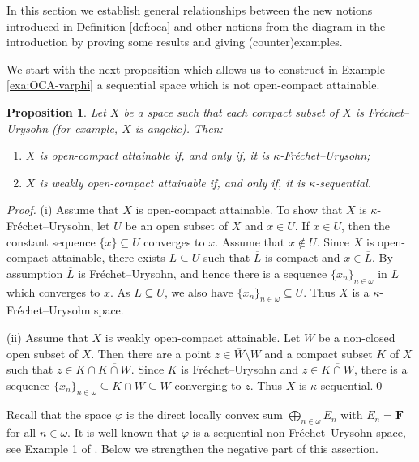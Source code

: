 \documentclass[preprint,11pt]{elsarticle}
\newtheorem{proposition}[theorem]{Proposition}
\numberwithin{equation}{section}
\numberwithin{theorem}{section}
\newcommand{\w}{\omega}
\newcommand{\SM}{{\setminus}}
\begin{document}
In this section we establish general relationships between the new notions introduced  in Definition \ref{def:oca} and other notions from the diagram in the introduction by proving some results and giving (counter)examples.

We start with the next proposition which allows us to construct in Example \ref{exa:OCA-varphi} a sequential space which is not open-compact attainable.  %
\begin{proposition} \label{p:OCA-kappaFU}
Let $X$ be a space such that each compact subset of $X$ is Fr\'{e}chet--Urysohn (for example, $X$ is angelic). Then:
\begin{enumerate}
\item[{\rm(i)}] $X$ is open-compact attainable if, and only if, it is $\kappa$-Fr\'{e}chet--Urysohn;
\item[{\rm(ii)}] $X$ is weakly open-compact attainable if, and only if, it is $\kappa$-sequential.
\end{enumerate}
\end{proposition}

\begin{proof}
(i) Assume that $X$ is open-compact attainable. To show that $X$ is  $\kappa$-Fr\'{e}chet--Urysohn, let $U$ be an open subset of $X$ and $x\in \overline{U}$. If $x\in U$, then the constant sequence $\{x\}\subseteq U$ converges to $x$. Assume that $x\not\in U$. Since $X$ is open-compact attainable, there exists $L\subseteq U$ such that $\overline{L}$ is compact and $x\in \overline{L}$. By assumption $\overline{L}$ is Fr\'{e}chet--Urysohn, and hence there is a sequence $\{x_n\}_{n\in\w}$ in $L$ which converges to $x$. As $L\subseteq U$, we also have $\{x_n\}_{n\in\w}\subseteq U$. Thus $X$ is a $\kappa$-Fr\'{e}chet--Urysohn space.
\smallskip

(ii) Assume that $X$ is weakly open-compact attainable.  Let $W$ be a non-closed open subset of $X$. Then there are a point $z\in \overline{W}\SM W$ and a compact subset $K$ of $X$ such that $z\in K\cap \overline{K\cap W}$. Since $K$ is Fr\'{e}chet--Urysohn and $z\in\overline{K\cap W}$, there is a sequence  $\{x_n\}_{n\in\w}\subseteq K\cap W\subseteq W$ converging to $z$. Thus $X$ is  $\kappa$-sequential.\qed
\end{proof}


Recall that the space $\varphi$ is the direct locally convex sum $\bigoplus_{n\in\w} E_n$ with $E_n=\mathbf{F}$ for all $n\in\w$. It is well known that $\varphi$ is a sequential non-Fr\'{e}chet--Urysohn space, see Example 1 of \cite{nyikos}. Below we strengthen the negative part of this assertion.
\end{document}
